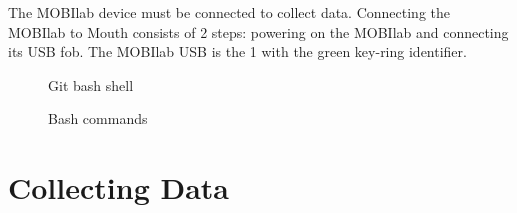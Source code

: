 \documentclass[11pt]{article}
\begin{document}
The MOBIlab device must be connected to collect data.  Connecting the MOBIlab to Mouth consists of 2 steps: powering on the MOBIlab and connecting its USB fob.  The MOBIlab USB is the 1 with the green key-ring identifier.

\begin{figure}[]
\caption{\label{fig:gitbash} Git bash shell}
\end{figure}

\begin{figure}[]
\caption{\label{fig:bash-cmds}  Bash commands }
\end{figure}

\section{Collecting Data}\label{collector}
\end{document}
